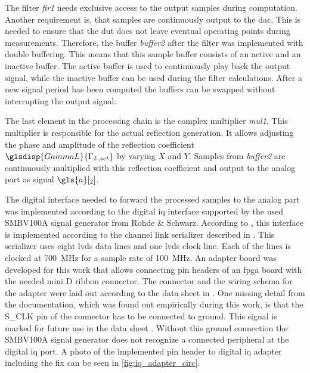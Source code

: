 \documentclass[12pt,a4paper,parskip=full,abstract=true,BCOR=12mm]{scrreprt}
\def\device#1{\mbox{\textit{#1}}}
\begin{document}
The filter \device{fir1} needs exclusive access to the output samples during computation.
Another requirement is, that samples are continuously output to the \gls{dac}. This
is needed to ensure that the \gls{dut} does not leave eventual operating points during
measurements. Therefore, the buffer \device{buffer2} after the filter was implemented
with double buffering. This means that this sample buffer consists of an active
and an inactive buffer. The active buffer is used to continuously play back the output
signal, while the inactive buffer can be used during the filter calculations. After
a new signal period has been computed the buffers can be swapped without interrupting
the output signal.

The last element in the processing chain is the complex multiplier \device{mul1}. This
multiplier is responsible for the actual reflection generation. It allows
adjusting the phase and amplitude of the reflection coefficient $\glsdisp{GammaL}{\Gamma_{L,set}}$ by
varying $X$ and $Y$. Samples from \device{buffer2} are continuously multiplied
with this reflection coefficient and output to the analog part as signal $\gls{a}[_2]$.

The digital interface needed to forward the processed samples to the analog part
was implemented according to the digital \gls{iq} interface supported by the used
SMBV100A signal generator from Rohde \& Schwarz. According to \cite{fsq_b17}, this interface is
implemented according to the channel link serializer described in \cite{ds90cr485}. This
serializer uses eight \gls{lvds} data lines and one \gls{lvds} clock line. Each of the lines
is clocked at \SI{700}{\mega\hertz} for a sample rate of \SI{100}{\mega\hertz}. An adapter
board was developed for this work that allows connecting pin headers of an \gls{fpga} board with
the needed mini D ribbon connector\cite{fsq_b17}. The connector and the wiring schema for the adapter
were laid out according to the data sheet in \cite{fsq_b17}. One missing detail from the documentation,
which was found out empirically during this work, is that the S\_CLK pin of the connector
has to be connected to ground. This signal is marked for future use in the data sheet \cite{fsq_b17}.
Without this ground connection the SMBV100A signal generator does not recognize a connected peripheral
at the digital \gls{iq} port. A photo of the implemented pin header to digital \gls{iq} adapter including
the fix can be seen in \cref{fig:iq_adapter_circ}.
\end{document}
